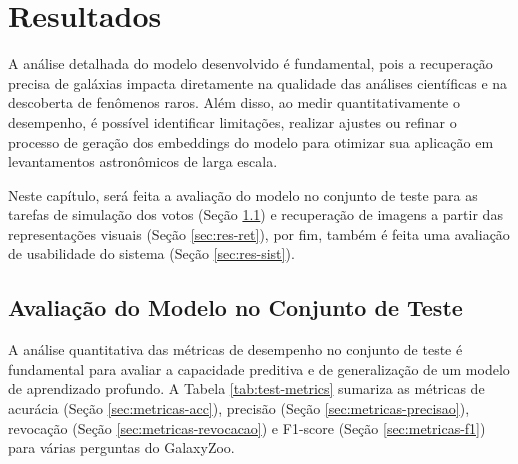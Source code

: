 \section{Resultados}
\label{cap:resultados}

A análise detalhada do modelo desenvolvido é fundamental, pois a recuperação precisa de galáxias impacta diretamente na qualidade das análises científicas e na descoberta de fenômenos raros. Além disso, ao medir quantitativamente o desempenho, é possível identificar limitações, realizar ajustes ou refinar o processo de geração dos embeddings do modelo para otimizar sua aplicação em levantamentos astronômicos de larga escala.

Neste capítulo, será feita a avaliação do modelo no conjunto de teste para as tarefas de simulação dos votos (Seção \ref{sec:res-teste}) e recuperação de imagens a partir das representações visuais (Seção \ref{sec:res-ret}), por fim, também é feita uma avaliação de usabilidade do sistema (Seção \ref{sec:res-sist}).





\subsection{Avaliação do Modelo no Conjunto de Teste}
\label{sec:res-teste}

A análise quantitativa das métricas de desempenho no conjunto de teste é fundamental para avaliar a capacidade preditiva e de generalização de um modelo de aprendizado profundo. A Tabela \ref{tab:test-metrics} sumariza as métricas de acurácia (Seção \ref{sec:metricas-acc}), precisão (Seção \ref{sec:metricas-precisao}), revocação (Seção \ref{sec:metricas-revocacao}) e F1-score (Seção \ref{sec:metricas-f1}) para várias perguntas do GalaxyZoo.

